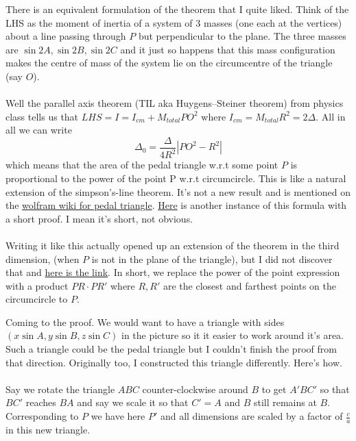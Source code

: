 \documentclass{article}
\begin{document}
\begin{tcolorbox}
There is an equivalent formulation of the theorem that I quite liked. Think of the LHS as the moment of inertia of a system of 3 masses (one each at the vertices) about a line passing through $P$ but perpendicular to the plane. The three masses are $\sin 2A, \sin 2B, \sin 2C$ and it just so happens that this mass configuration makes the centre of mass of the system lie on the circumcentre of the triangle (say $O$). 
\\\\
Well the parallel axis theorem (TIL aka Huygens–Steiner theorem) from physics class tells us that $LHS = I = I_{cm} + M_{total} PO^2$ where $I_{cm} = M_{total}R^2 = 2\Delta$. All in all we can write $$\Delta_0 = \frac{\Delta}{4R^2}\left|PO^2-R^2\right|$$
which means that the area of the pedal triangle w.r.t some point $P$ is proportional to the power of the point P w.r.t circumcircle. This is like a natural extension of the simpson's-line theorem. It's not a new result and is mentioned on the \href{https://mathworld.wolfram.com/PedalTriangle.html}{wolfram wiki for pedal triangle}. \href{http://users.math.uoc.gr/~pamfilos/eGallery/problems/AreaOfPedal.html}{Here} is another instance of this formula with a short proof. I mean it's short, not obvious. 
\\\\
Writing it like this actually opened up an extension of the theorem in the third dimension, (when $P$ is not in the plane of the triangle), but I did not discover that and \href{https://math.stackexchange.com/a/3511837/420484}{here is the link}. In short, we replace the power of the point expression with a product $PR\cdot PR'$ where $R,R'$ are the closest and farthest points on the circumcircle to $P$.
\end{tcolorbox}

Coming to the proof. We would want to have a triangle with sides $(x\sin A, y\sin B, z\sin C)$ in the picture so it it easier to work around it's area. Such a triangle could be the pedal triangle but I couldn't finish the proof from that direction. Originally too, I constructed this triangle differently. Here's how.
\\\\
Say we rotate the triangle $ABC$ counter-clockwise around $B$ to get $A'BC'$ so that $BC'$ reaches $BA$ and say we scale it so that $C' = A$ and $B$ still remains at $B$. Corresponding to $P$ we have here $P'$ and all dimensions are scaled by a factor of $\frac{c}{a}$ in this new triangle.
\end{document}
